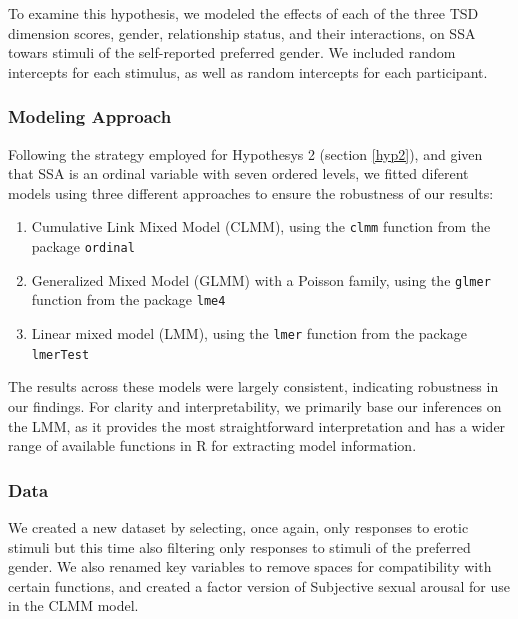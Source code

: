 \documentclass[
  bookmarksnumbered]{article}
\providecommand{\tightlist}{%
  \setlength{\itemsep}{0pt}\setlength{\parskip}{0pt}}
\begin{document}
To examine this hypothesis, we modeled the effects of each of the three TSD dimension scores, gender, relationship status, and their interactions, on SSA towars stimuli of the self-reported preferred gender. We included random intercepts for each stimulus, as well as random intercepts for each participant.

\subsubsection{Modeling Approach}\label{modeling-approach-1}

Following the strategy employed for Hypothesys 2 (section \ref{hyp2}), and given that SSA is an ordinal variable with seven ordered levels, we fitted diferent models using three different approaches to ensure the robustness of our results:

\begin{enumerate}
\def\labelenumi{\arabic{enumi}.}
\tightlist
\item
  Cumulative Link Mixed Model (CLMM), using the \texttt{clmm} function from the package \texttt{ordinal} \autocite{ordinalcit}
\item
  Generalized Mixed Model (GLMM) with a Poisson family, using the \texttt{glmer} function from the package \texttt{lme4} \autocite{lme4cit}
\item
  Linear mixed model (LMM), using the \texttt{lmer} function from the package \texttt{lmerTest} \autocite{lmertestcit}
\end{enumerate}

The results across these models were largely consistent, indicating robustness in our findings. For clarity and interpretability, we primarily base our inferences on the LMM, as it provides the most straightforward interpretation and has a wider range of available functions in R for extracting model information.

\subsubsection{Data}\label{data-2}

We created a new dataset by selecting, once again, only responses to erotic stimuli but this time also filtering only responses to stimuli of the preferred gender. We also renamed key variables to remove spaces for compatibility with certain functions, and created a factor version of Subjective sexual arousal for use in the CLMM model.
\end{document}
